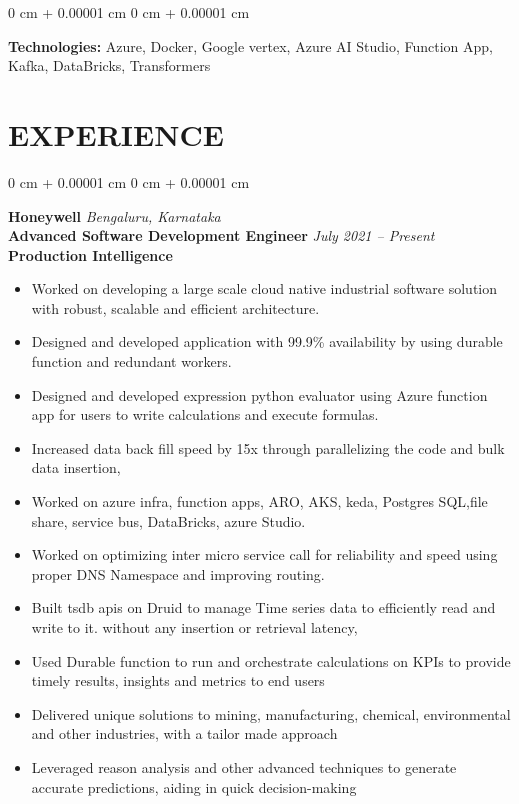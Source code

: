 \documentclass[10pt, letterpaper]{article}
\newenvironment{highlights}{
    \begin{itemize}[
        topsep=0.03 cm,
        parsep=0.02 cm,
        partopsep=0pt,
        itemsep=0pt,
        leftmargin=0 cm + 5pt
    ]
}{
    \end{itemize}
} %
\newenvironment{onecolentry}{
    \begin{adjustwidth}{
        0 cm + 0.00001 cm
    }{
        0 cm + 0.00001 cm
    }
}{
    \end{adjustwidth}
} %
\begin{document}
        \vspace{0.03 cm}

        \begin{onecolentry}
            \textbf{Technologies:} Azure, Docker, Google vertex, Azure AI Studio, Function App, Kafka, DataBricks, Transformers\end{onecolentry}

        

    \section{EXPERIENCE}

    
        \begin{onecolentry}
            \textbf{\large Honeywell} \hfill \textit{\textcolor{darkteal}{Bengaluru, Karnataka}} \\  
            \textbf{\normalsize Advanced Software Development Engineer} \hfill \textit{\textcolor{darkteal}{July 2021 – Present}} \\ %
            \textbf{Production Intelligence} \\  
            \begin{adjustwidth}{0.4cm}{0cm}
                \begin{highlights}
                    \item Worked on developing a large scale cloud native industrial software solution with robust, scalable and efficient architecture.
                    \item Designed and developed application with 99.9\% availability by using durable function and redundant workers.
                    \item Designed and developed expression python evaluator using Azure function app for users to write calculations and execute formulas.
                    \item Increased data back fill speed by 15x through parallelizing the code and bulk data insertion,
                    \item Worked on azure infra, function apps, ARO, AKS, keda, Postgres SQL,file share, service bus, DataBricks, azure Studio. 
                    \item Worked on optimizing inter micro service call for reliability and speed using proper DNS Namespace and improving routing.
                    \item Built tsdb apis on Druid to manage Time series data to efficiently read and write to it. without any insertion or retrieval latency,
                    \item Used Durable function to run and orchestrate calculations on KPIs to provide timely results, insights and metrics to end users
                    \item Delivered unique solutions to mining, manufacturing, chemical, environmental and other industries, with a tailor made approach
                    \item Leveraged reason analysis and other advanced techniques to generate accurate predictions, aiding in quick decision-making
                    

\end{highlights}
\end{adjustwidth}
\end{onecolentry}
\end{document}
